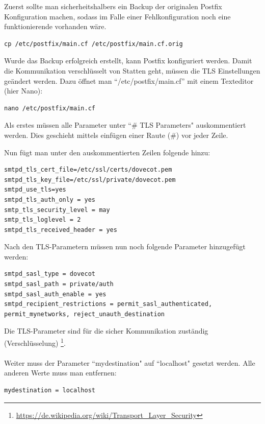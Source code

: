 Zuerst sollte man sicherheitshalbers ein Backup der originalen Postfix Konfiguration machen, sodass im Falle einer Fehlkonfiguration noch eine funktionierende vorhanden wäre. 

\begin{lstlisting}
cp /etc/postfix/main.cf /etc/postfix/main.cf.orig
\end{lstlisting}

Wurde das Backup erfolgreich erstellt, kann Postfix konfiguriert werden. Damit die Kommunikation verschlüsselt von Statten geht, müssen die TLS Einstellungen geändert werden.
Dazu öffnet man ``/etc/postfix/main.cf'' mit einem Texteditor (hier Nano):

\begin{lstlisting}
nano /etc/postfix/main.cf
\end{lstlisting}

Als erstes müssen alle Parameter unter ``# TLS Parameters" auskommentiert werden. Dies geschieht mittels einfügen einer Raute (#) vor jeder Zeile.

Nun fügt man unter den auskommentierten Zeilen folgende hinzu:

\begin{lstlisting}
smtpd_tls_cert_file=/etc/ssl/certs/dovecot.pem
smtpd_tls_key_file=/etc/ssl/private/dovecot.pem
smtpd_use_tls=yes
smtpd_tls_auth_only = yes
smtp_tls_security_level = may
smtp_tls_loglevel = 2
smtpd_tls_received_header = yes
\end{lstlisting}

Nach den TLS-Parametern müssen nun noch folgende Parameter hinzugefügt werden:

\begin{lstlisting}
smtpd_sasl_type = dovecot
smtpd_sasl_path = private/auth
smtpd_sasl_auth_enable = yes
smtpd_recipient_restrictions = permit_sasl_authenticated, permit_mynetworks, reject_unauth_destination
\end{lstlisting}

Die TLS-Parameter sind für die sicher Kommunikation zuständig (Verschlüsselung)
\footnote{\url{https://de.wikipedia.org/wiki/Transport\_Layer\_Security}}.
\\
\\
Weiter muss der Parameter ``mydestination" auf ``localhost" gesetzt werden. Alle anderen Werte muss man entfernen:

\begin{lstlisting}
mydestination = localhost
\end{lstlisting}

